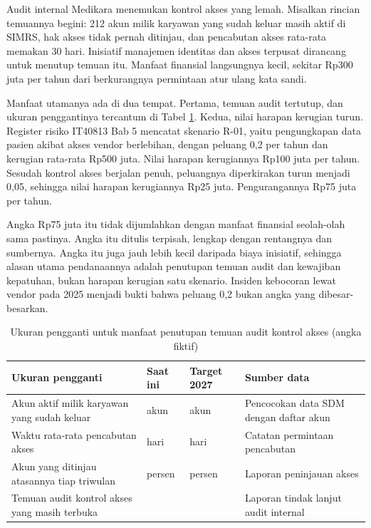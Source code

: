 \begin{kasus}[title={Kasus Medikara Health: Menutup Temuan Audit Kontrol Akses}]
Audit internal Medikara menemukan kontrol akses yang lemah. Misalkan rincian
temuannya begini: 212 akun milik karyawan yang sudah keluar masih aktif di
SIMRS, hak akses tidak pernah ditinjau, dan pencabutan akses rata-rata
memakan 30 hari. Inisiatif manajemen identitas dan akses terpusat dirancang
untuk menutup temuan itu. Manfaat finansial langsungnya kecil, sekitar Rp300
juta per tahun dari berkurangnya permintaan atur ulang kata sandi.

Manfaat utamanya ada di dua tempat. Pertama, temuan audit tertutup, dan
ukuran penggantinya tercantum di Tabel \ref{tab:ch13-ukuran-pengganti}.
Kedua, nilai harapan kerugian turun. Register risiko IT40813 Bab 5 mencatat
skenario R-01, yaitu pengungkapan data pasien akibat akses vendor berlebihan,
dengan peluang 0,2 per tahun dan kerugian rata-rata Rp500 juta. Nilai harapan
kerugiannya Rp100 juta per tahun. Sesudah kontrol akses berjalan penuh,
peluangnya diperkirakan turun menjadi 0,05, sehingga nilai harapan kerugiannya
Rp25 juta. Pengurangannya Rp75 juta per tahun.

Angka Rp75 juta itu tidak dijumlahkan dengan manfaat finansial seolah-olah
sama pastinya. Angka itu ditulis terpisah, lengkap dengan rentangnya dan
sumbernya. Angka itu juga jauh lebih kecil daripada biaya inisiatif, sehingga
alasan utama pendanaannya adalah penutupan temuan audit dan kewajiban
kepatuhan, bukan harapan kerugian satu skenario. Insiden kebocoran lewat vendor
pada 2025 menjadi bukti bahwa peluang 0,2 bukan angka yang dibesar-besarkan.
\end{kasus}

\begin{table}[!htb]
  \centering
  \caption{Ukuran pengganti untuk manfaat penutupan temuan audit kontrol
           akses (angka fiktif)}
  \label{tab:ch13-ukuran-pengganti}
  \footnotesize
  \begin{tabularx}{\textwidth}{>{\raggedright\arraybackslash}X
                               >{\raggedright\arraybackslash}p{1.8cm}
                               >{\raggedright\arraybackslash}p{1.8cm}
                               >{\raggedright\arraybackslash}X}
    \hline
    \textbf{Ukuran pengganti} & \textbf{Saat ini} & \textbf{Target 2027} &
      \textbf{Sumber data} \\
    \hline
    Akun aktif milik karyawan yang sudah keluar & 212 akun & 0 akun &
      Pencocokan data SDM dengan daftar akun \\
    \hline
    Waktu rata-rata pencabutan akses & 30 hari & 1 hari & Catatan
      permintaan pencabutan \\
    \hline
    Akun yang ditinjau atasannya tiap triwulan & 0 persen & 100 persen &
      Laporan peninjauan akses \\
    \hline
    Temuan audit kontrol akses yang masih terbuka & 1 & 0 & Laporan tindak
      lanjut audit internal \\
    \hline
  \end{tabularx}
\end{table}

